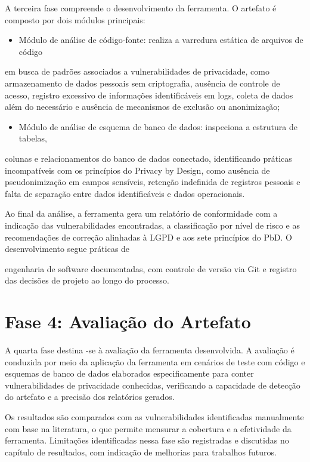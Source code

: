 \documentclass[oneside]{normas-utf-tex}
\begin{document}
A terceira fase compreende o desenvolvimento da ferramenta. O artefato é composto por dois módulos principais:

\begin{itemize}
\item Módulo de análise de código-fonte: realiza a varredura estática de arquivos de código
\end{itemize}

em busca de padrões associados a vulnerabilidades de privacidade, como armazenamento de dados pessoais sem criptografia, ausência de controle de acesso, registro excessivo de informações identificáveis em logs, coleta de dados além do necessário e ausência de mecanismos de exclusão ou anonimização;

\begin{itemize}
\item Módulo de análise de esquema de banco de dados: inspeciona a estrutura de tabelas,
\end{itemize}

colunas e relacionamentos do banco de dados conectado, identificando práticas incompatíveis com os princípios do Privacy by Design, como ausência de pseudonimização em campos sensíveis, retenção indefinida de registros pessoais e falta de separação entre dados identificáveis e dados operacionais.

Ao final da análise, a ferramenta gera um relatório de conformidade com a indicação das vulnerabilidades encontradas, a classificação por nível de risco e as recomendações de correção alinhadas à LGPD e aos sete princípios do PbD. O desenvolvimento segue práticas de

engenharia de software documentadas, com controle de versão via Git e registro das decisões de projeto ao longo do processo.

\section{Fase 4: Avaliação do Artefato}

A quarta fase destina -se à avaliação da ferramenta desenvolvida. A avaliação é conduzida por meio da aplicação da ferramenta em cenários de teste com código e esquemas de banco de dados elaborados especificamente para conter vulnerabilidades de privacidade conhecidas, verificando a capacidade de detecção do artefato e a precisão dos relatórios gerados.

Os resultados são comparados com as vulnerabilidades identificadas manualmente com base na literatura, o que permite mensurar a cobertura e a efetividade da ferramenta. Limitações identificadas nessa fase são registradas e discutidas no capítulo de resultados, com indicação de melhorias para trabalhos futuros.
\end{document}
